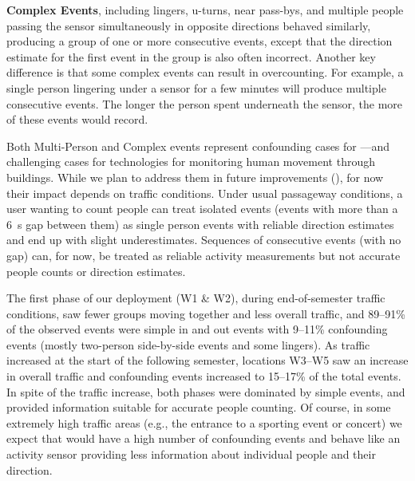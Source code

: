 \textbf{Complex Events}, including lingers, u-turns, near pass-bys, and multiple people passing the sensor simultaneously in opposite directions behaved similarly, producing a group of one or more consecutive events, except that the direction estimate for the first event in the group is also often incorrect.
Another key difference is that some complex events can result in overcounting.
For example, a single person lingering under a \sysname sensor for a few minutes will produce multiple consecutive events.
The longer the person spent underneath the sensor, the more of these events \sysname would record.


Both Multi-Person and Complex events represent confounding cases for \sysname---and challenging cases for technologies for monitoring human movement through buildings.
While we plan to address them in future improvements (), for now their impact depends on traffic conditions.
Under usual passageway conditions, a user wanting to count people can treat isolated events (events with more than a \SI{6}{\second} gap between them) as single person events with reliable direction estimates and end up with slight underestimates.
Sequences of consecutive events (with no gap) can, for now, be treated as reliable activity measurements but not accurate people counts or direction estimates.


The first phase of our deployment (W1 \& W2), during end-of-semester traffic conditions, saw fewer groups moving together and less overall traffic, and 89--91\% of the observed events were simple in and out events with 9--11\% confounding events (mostly two-person side-by-side events and some lingers).
As traffic increased at the start of the following semester, locations W3--W5 saw an increase in overall traffic and confounding events increased to 15--17\% of the total events.
In spite of the traffic increase, both phases were dominated by simple events, and \sysname provided information suitable for accurate people counting.
Of course, in some extremely high traffic areas (e.g., the entrance to a sporting event or concert) we expect that \sysname would have a high number of confounding events and behave like an activity sensor providing less information about individual people and their direction.  


